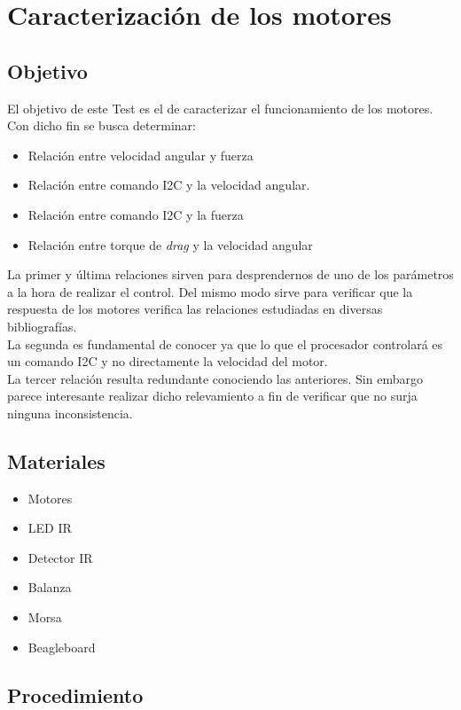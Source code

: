 \documentclass[spanish,12pt,a4paper,titlepage]{report}
\begin{document}
\chapter{Caracterización de los motores}
\section{Objetivo}
El objetivo de este Test es el de caracterizar el funcionamiento de los motores. Con dicho fin se busca determinar:

\begin{itemize}
\item Relación entre velocidad angular y fuerza
\item Relación entre comando I2C y la velocidad angular.
\item Relación entre comando I2C y la fuerza
\item Relación entre torque de \emph{drag} y la velocidad angular
\end{itemize}

La primer y última relaciones sirven para desprendernos de uno de los parámetros a la hora de realizar el control. Del mismo modo sirve para verificar que la respuesta de los motores verifica las relaciones estudiadas en diversas bibliografías.\\

La segunda es fundamental de conocer ya que lo que el procesador controlará es un comando I2C y no directamente la velocidad del motor. \\

La tercer relación resulta redundante conociendo las anteriores. Sin embargo parece interesante realizar dicho relevamiento a fin de verificar que no surja ninguna inconsistencia. \\


\section{Materiales}
\begin{itemize}
\item Motores
\item LED IR
\item Detector IR
\item Balanza
\item Morsa
\item Beagleboard
\end{itemize}

\section{Procedimiento}
\end{document}
